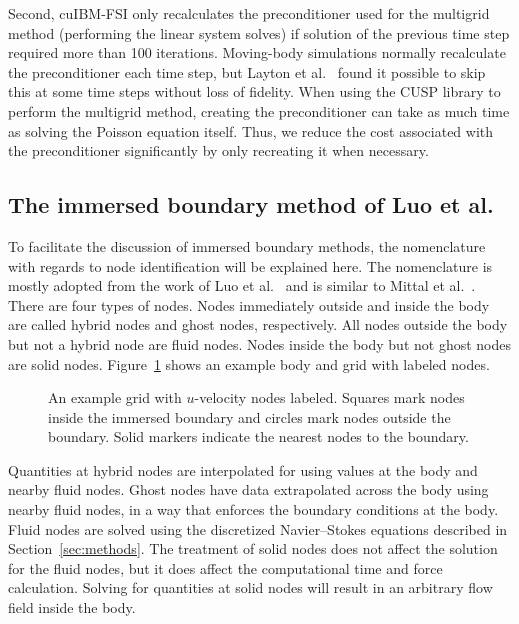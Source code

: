 \documentclass[preprint,12pt]{elsarticle}
\begin{document}
Second, cuIBM-FSI only recalculates the preconditioner used for the multigrid method (performing the linear system solves) if solution of the previous time step required more than 100 iterations.
Moving-body simulations normally recalculate the preconditioner each time step, but Layton et al.~\cite{layton2011cuibm} found it possible to skip this at some time steps without loss of fidelity.
When using the CUSP library to perform the multigrid method, creating the preconditioner can take as much time as solving the Poisson equation itself.
Thus, we reduce the cost associated with the preconditioner significantly by only recreating it when necessary.

\subsection{The immersed boundary method of Luo et al.}
%
To facilitate the discussion of immersed boundary methods, the nomenclature with regards to node identification will be explained here.
The nomenclature is mostly adopted from the work of Luo et al.~\cite{Luo:2012gx} and is similar to Mittal et al.~\cite{Mittal:2005ii}.
There are four types of nodes.
Nodes immediately outside and inside the body are called hybrid nodes and ghost nodes, respectively.
All nodes outside the body but not a hybrid node are fluid nodes.
Nodes inside the body but not ghost nodes are solid nodes.
Figure~\ref{fig:node id} shows an example body and grid with labeled nodes.

\begin{figure}[htbp]
	\centering
	
	\caption{An example grid with $u$-velocity nodes labeled. Squares mark nodes inside the immersed boundary and circles mark nodes outside the boundary. Solid markers indicate the nearest nodes to the boundary.}
	\label{fig:node id}
\end{figure}

Quantities at hybrid nodes are interpolated for using values at the body and nearby fluid nodes.
Ghost nodes have data extrapolated across the body using nearby fluid nodes, in a way that enforces the boundary conditions at the body.
Fluid nodes are solved using the discretized Navier--Stokes equations described in Section~\ref{sec:methods}.
The treatment of solid nodes does not affect the solution for the fluid nodes, but it does affect the computational time and force calculation.
Solving for quantities at solid nodes will result in an arbitrary flow field inside the body.
\end{document}

